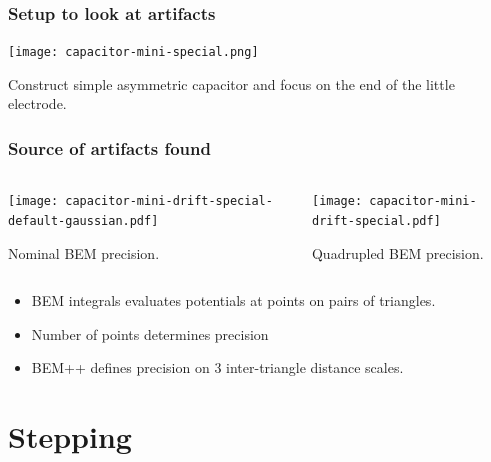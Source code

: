 \documentclass[xcolor=dvipsnames]{beamer}
\begin{document}
\begin{frame}
  \frametitle{Setup to look at artifacts}
  \begin{center}
    \texttt{[image: capacitor-mini-special.png]}    
  \end{center}
  Construct simple asymmetric capacitor and focus on the end of the
  little electrode.
\end{frame}
\begin{frame}
  \frametitle{Source of artifacts found}
  \footnotesize
  \begin{columns}
    \begin{column}{0.5\textwidth}
      \begin{center}
        \texttt{[image: capacitor-mini-drift-special-default-gaussian.pdf]}

        Nominal BEM precision.
      \end{center}
    \end{column}
    \begin{column}{0.5\textwidth}
      \begin{center}
        \texttt{[image: capacitor-mini-drift-special.pdf]}

        Quadrupled BEM precision.
      \end{center}
    \end{column}
  \end{columns}
  \begin{itemize}
  \item BEM integrals evaluates potentials at points on pairs of triangles.
  \item Number of points determines precision
  \item BEM++ defines precision on 3 inter-triangle distance scales.
  \end{itemize}
\end{frame}
\section{Stepping}
\end{document}
